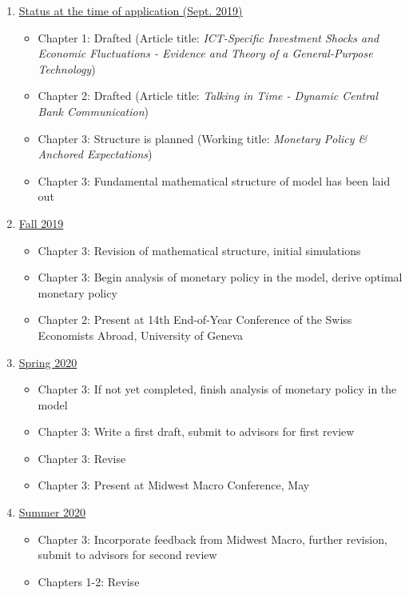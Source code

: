 \documentclass[11pt]{article}
\renewcommand{\[}{\begin{equation}}
\renewcommand{\]}{\end{equation}}
\begin{document}
\begin{enumerate}
\item[]{\underline{Status at the time of application (Sept. 2019)}} 
\begin{itemize}
\item Chapter 1: Drafted (Article title: \emph{ICT-Specific Investment Shocks and Economic Fluctuations - Evidence and Theory of a General-Purpose Technology})
\item Chapter 2: Drafted (Article title: \emph{Talking in Time - Dynamic Central Bank Communication})
\item Chapter 3: Structure is planned (Working title: \emph{Monetary Policy \& Anchored Expectations})
\item Chapter 3: Fundamental mathematical structure of model has been laid out
\end{itemize}
\item[]{\underline{Fall 2019}} 
\vspace{-0.2cm}
\begin{itemize}
\item Chapter 3: Revision of mathematical structure, initial simulations
\item Chapter 3: Begin analysis of monetary policy in the model, derive optimal monetary policy
\item Chapter 2: Present at 14th End-of-Year Conference of the Swiss Economists Abroad, University of Geneva
\end{itemize}
\item[]{\underline{Spring 2020}} 
\vspace{-0.2cm}
\begin{itemize}
\item Chapter 3: If not yet completed, finish analysis of monetary policy in the model
\item Chapter 3: Write a first draft, submit to advisors for first review
\item Chapter 3: Revise
\item Chapter 3: Present at Midwest Macro Conference, May
\end{itemize}
\item[]{\underline{Summer 2020}} 
\vspace{-0.2cm}
\begin{itemize}
\item Chapter 3: Incorporate feedback from Midwest Macro, further revision, submit to advisors for second review
\item Chapters 1-2: Revise
\end{itemize}

\end{enumerate}
\end{document}
